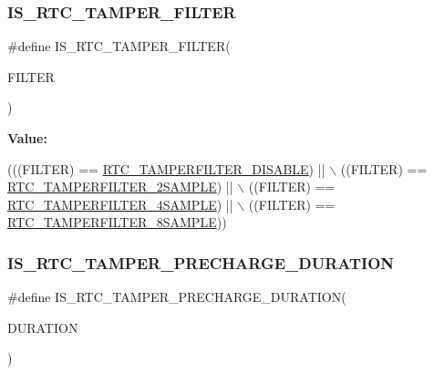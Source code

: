 \subsubsection{\texorpdfstring{I\+S\+\_\+\+R\+T\+C\+\_\+\+T\+A\+M\+P\+E\+R\+\_\+\+F\+I\+L\+T\+ER}{IS\_RTC\_TAMPER\_FILTER}}
{\footnotesize\ttfamily \#define I\+S\+\_\+\+R\+T\+C\+\_\+\+T\+A\+M\+P\+E\+R\+\_\+\+F\+I\+L\+T\+ER(\begin{DoxyParamCaption}\item[{}]{F\+I\+L\+T\+ER }\end{DoxyParamCaption})}

{\bfseries Value\+:}
\begin{DoxyCode}
(((FILTER) == \hyperlink{group___r_t_c_ex___tamper___filter___definitions_ga0809aebfef5642f8f2a8d04b0aed4d98}{RTC\_TAMPERFILTER\_DISABLE}) || \(\backslash\)
                                       ((FILTER) == \hyperlink{group___r_t_c_ex___tamper___filter___definitions_ga4338b957d061fa9d1d51d403275fe391}{RTC\_TAMPERFILTER\_2SAMPLE}) || \(\backslash\)
                                       ((FILTER) == \hyperlink{group___r_t_c_ex___tamper___filter___definitions_gabd9f9f1c669c073d58bd71257faa079e}{RTC\_TAMPERFILTER\_4SAMPLE}) || \(\backslash\)
                                       ((FILTER) == \hyperlink{group___r_t_c_ex___tamper___filter___definitions_ga3689ed6d70107f0acc92aae8b13600bd}{RTC\_TAMPERFILTER\_8SAMPLE}))
\end{DoxyCode}
\mbox{\label{group___r_t_c_ex___i_s___r_t_c___definitions_gafcbbdc089fbfc3c82a12d0fcdcee8473}} 
\subsubsection{\texorpdfstring{I\+S\+\_\+\+R\+T\+C\+\_\+\+T\+A\+M\+P\+E\+R\+\_\+\+P\+R\+E\+C\+H\+A\+R\+G\+E\+\_\+\+D\+U\+R\+A\+T\+I\+ON}{IS\_RTC\_TAMPER\_PRECHARGE\_DURATION}}
{\footnotesize\ttfamily \#define I\+S\+\_\+\+R\+T\+C\+\_\+\+T\+A\+M\+P\+E\+R\+\_\+\+P\+R\+E\+C\+H\+A\+R\+G\+E\+\_\+\+D\+U\+R\+A\+T\+I\+ON(\begin{DoxyParamCaption}\item[{}]{D\+U\+R\+A\+T\+I\+ON }\end{DoxyParamCaption})}

